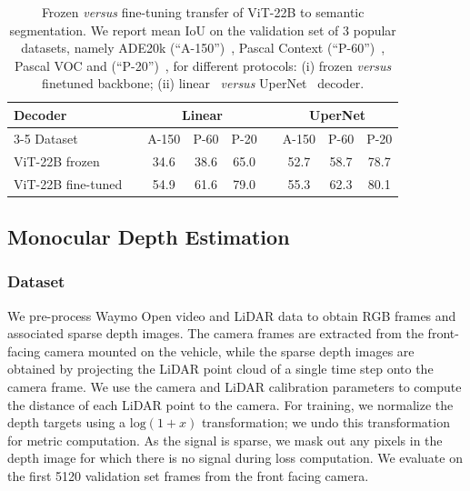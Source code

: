 \documentclass{article}
\newcommand{\chonk}{\mbox{ViT-22B}\xspace}
\begin{document}
\begin{table}[h]
    \caption{
      {Frozen \textit{versus} fine-tuning transfer of \chonk to semantic segmentation.} 
We report mean IoU on the validation set of 3 popular datasets, namely ADE20k (``A-150'')~\citep{zhou2017scene}, Pascal Context (``P-60'')~\citep{mottaghi2014role}, Pascal VOC and (``P-20'')~\citep{everingham2010pascal}, for different protocols:
(i) frozen \textit{versus} finetuned backbone;
(ii) linear~\citep{strudel2021segmenter} \textit{versus} UperNet~\citep{xiao2018unified} decoder.
}
\centering
    \begin{tabular}{@{} l c ccc c ccc @{}}
      \toprule
      Decoder && \multicolumn{3}{c}{Linear} && \multicolumn{3}{c}{UperNet} \\
\cmidrule{3-5}\cmidrule{7-9}
	      Dataset && A-150 & P-60 & P-20 && A-150 & P-60 & P-20 \\
      \midrule
      \chonk frozen && 34.6 & 38.6 & 65.0 && 52.7 & 58.7 & 78.7 \\
      \chonk fine-tuned\hspace{-1em} && 54.9 & 61.6 & 79.0 && 55.3 & 62.3 & 80.1\\
      \bottomrule
 \end{tabular}
    \label{tab:semseg_frozen_finetune}
\end{table}

\subsection{Monocular Depth Estimation}
\label{app:de}

\subsubsection{Dataset}

We pre-process Waymo Open video and LiDAR data to obtain RGB frames and associated sparse depth images. The camera frames are extracted from the front-facing camera mounted on the vehicle, while the sparse depth images are obtained by projecting the LiDAR point cloud of a single time step onto the camera frame. We use the camera and LiDAR calibration parameters to compute the distance of each LiDAR point to the camera. For training, we normalize the depth targets using a $\mathrm{log}(1+x)$ transformation; we undo this transformation for metric computation. As the signal is sparse, we mask out any pixels in the depth image for which there is no signal during loss computation.
We evaluate on the first 5120 validation set frames from the front facing camera.
\end{document}
